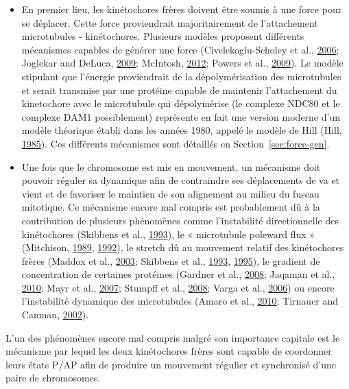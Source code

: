 \documentclass[12pt,a4paper,twoside,openright]{book}
\begin{document}
\begin{itemize}
\item
  En premier lieu, les kinétochores frères doivent être soumis à une
  force pour se déplacer. Cette force proviendrait majoritairement de
  l'attachement microtubules - kinétochores. Plusieurs modèles proposent
  différents mécanismes capables de générer une force
  (Civelekoglu-Scholey et al.,
  \hyperref[ref-Civelekoglu-Scholey2006]{2006}; Joglekar and DeLuca,
  \hyperref[ref-Joglekar2009]{2009}; McIntosh,
  \hyperref[ref-McIntosh2012]{2012}; Powers et al.,
  \hyperref[ref-Powers2009a]{2009}). Le modèle stipulant que l'énergie
  proviendrait de la dépolymérisation des microtubules et serait
  transmise par une protéine capable de maintenir l'attachement du
  kinetochore avec le microtubule qui dépolymérise (le complexe NDC80 et
  le complexe DAM1 possiblement) représente en fait une version moderne
  d'un modèle théorique établi dans les années 1980, appelé le modèle de
  Hill (Hill, \hyperref[ref-Hill1985]{1985}). Ces différents mécanismes
  sont détaillés en Section~\ref{sec:force-gen}.
\item
  Une fois que le chromosome est mis en mouvement, un mécanisme doit
  pouvoir réguler sa dynamique afin de contraindre ses déplacements de
  va et vient et de favoriser le maintien de son alignement au milieu du
  fuseau mitotique. Ce mécanisme encore mal compris est probablement dû
  à la contribution de plusieurs phénomènes comme l'instabilité
  directionnelle des kinétochores (Skibbens et al.,
  \hyperref[ref-Skibbens1993]{1993}), le « microtubule poleward flux »
  (Mitchison, \hyperref[ref-Mitchison1989]{1989},
  \hyperref[ref-Mitchison1992]{1992}), le stretch dû au mouvement
  relatif des kinétochores frères (Maddox et al.,
  \hyperref[ref-Maddox2003]{2003}; Skibbens et al.,
  \hyperref[ref-Skibbens1993]{1993}, \hyperref[ref-Skibbens1995]{1995}),
  le gradient de concentration de certaines protéines (Gardner et al.,
  \hyperref[ref-Gardner2008a]{2008}; Jaqaman et al.,
  \hyperref[ref-Jaqaman2010]{2010}; Mayr et al.,
  \hyperref[ref-Mayr2007]{2007}; Stumpff et al.,
  \hyperref[ref-Stumpff2008]{2008}; Varga et al.,
  \hyperref[ref-Varga2006]{2006}) ou encore l'instabilité dynamique des
  microtubules (Amaro et al., \hyperref[ref-Amaro2010a]{2010}; Tirnauer
  and Canman, \hyperref[ref-Tirnauer2002]{2002}).
\end{itemize}

L'un des phénomènes encore mal compris malgré son importance capitale
est le mécanisme par lequel les deux kinétochores frères sont capable de
coordonner leurs états P/AP afin de produire un mouvement régulier et
synchronisé d'une paire de chromosomes.
\end{document}
